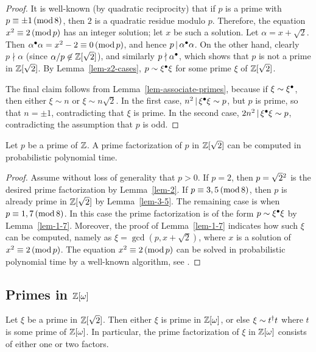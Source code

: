 \begin{proof}
  It is well-known (by quadratic reciprocity) that if $p$ is a prime
  with $p\equiv\pm1\,(\mathop{{\rm mod}}8)$, then $2$ is a quadratic residue modulo
  $p$. Therefore, the equation $x^2\equiv 2\,(\mathop{{\rm mod}} p)$ has an integer
  solution; let $x$ be such a solution. Let $\alpha=x+\sqrt2$. Then
  $\alpha^{\bullet}\alpha=x^2-2\equiv0\,(\mathop{{\rm mod}} p)$, and hence
  $p\mathop{|}\nolimits\alpha^{\bullet}\alpha$. On the other hand, clearly $p\nmid\alpha$
  (since $\alpha/p\not\in\mathbb{Z}[\sqrt2]$), and similarly
  $p\nmid\alpha^{\bullet}$, which shows that $p$ is not a prime in
  $\mathbb{Z}[\sqrt2]$. By Lemma~\ref{lem-z2-cases}, $p\sim\xi^{\bullet}\xi$ for
  some prime $\xi$ of $\mathbb{Z}[\sqrt 2]$. 

  The final claim follows from Lemma~\ref{lem-associate-primes},
  because if $\xi\sim\xi^{\bullet}$, then either $\xi\sim n$ or $\xi\sim
  n\sqrt2$. In the first case, $n^2\mathop{|}\nolimits \xi^{\bullet}\xi \sim p$, but $p$ is
  prime, so that $n=\pm 1$, contradicting that $\xi$ is prime. In the
  second case, $2n^2\mathop{|}\nolimits\xi^{\bullet}\xi\sim p$, contradicting the
  assumption that $p$ is odd.
\end{proof}

\begin{lemma}\label{lem-prime-factorization-z2}
  Let $p$ be a prime of $\mathbb{Z}$. A prime factorization of $p$ in
  $\mathbb{Z}[\sqrt2]$ can be computed in probabilistic polynomial time.
\end{lemma}

\begin{proof}
  Assume without loss of generality that $p>0$. If $p=2$, then
  $p=\sqrt{2}{}^{2}$ is the desired prime factorization by
  Lemma~\ref{lem-2}. If $p\equiv 3,5\,(\mathop{{\rm mod}}8)$, then $p$ is already
  prime in $\mathbb{Z}[\sqrt2]$ by Lemma~\ref{lem-3-5}. The remaining case is
  when $p\equiv 1,7\,(\mathop{{\rm mod}}8)$. In this case the prime factorization is
  of the form $p\sim\xi^{\bullet}\xi$ by Lemma~\ref{lem-1-7}. Moreover, the
  proof of Lemma~\ref{lem-1-7} indicates how such $\xi$ can be
  computed, namely as $\xi=\gcd(p,x+\sqrt2)$, where $x$ is a solution
  of $x^2\equiv 2\,(\mathop{{\rm mod}} p)$. The equation $x^2\equiv 2\,(\mathop{{\rm mod}} p)$ can be
  solved in probabilistic polynomial time by a well-known algorithm,
  see {\cite{Rabin1980}}.
\end{proof}

\subsection[{Primes in Z[omega]}]{Primes in $\mathbb{Z}[\omega]$}

\begin{lemma}
  Let $\xi$ be a prime in $\mathbb{Z}[\sqrt2]$. Then either $\xi$ is prime in
  $\mathbb{Z}[\omega]$, or else $\xi\sim t^{\dagger} t$ where $t$ is some prime of
  $\mathbb{Z}[\omega]$. In particular, the prime factorization
  of $\xi$ in $\mathbb{Z}[\omega]$ consists of either one or two factors. 
\end{lemma}


